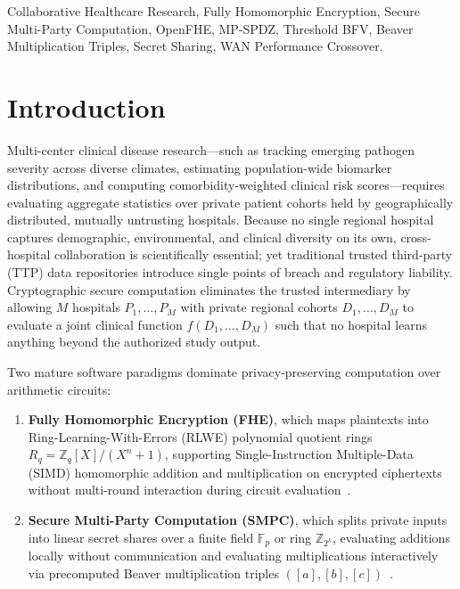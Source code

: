 \documentclass[conference]{IEEEtran}
\begin{document}
\begin{IEEEkeywords}
Collaborative Healthcare Research, Fully Homomorphic Encryption, Secure Multi-Party Computation, OpenFHE, MP-SPDZ, Threshold BFV, Beaver Multiplication Triples, Secret Sharing, WAN Performance Crossover.
\end{IEEEkeywords}

\section{Introduction}
Multi-center clinical disease research---such as tracking emerging pathogen severity across diverse climates, estimating population-wide biomarker distributions, and computing comorbidity-weighted clinical risk scores---requires evaluating aggregate statistics over private patient cohorts held by geographically distributed, mutually untrusting hospitals. Because no single regional hospital captures demographic, environmental, and clinical diversity on its own, cross-hospital collaboration is scientifically essential; yet traditional trusted third-party (TTP) data repositories introduce single points of breach and regulatory liability. Cryptographic secure computation eliminates the trusted intermediary by allowing $M$ hospitals $P_1, \dots, P_M$ with private regional cohorts $D_1, \dots, D_M$ to evaluate a joint clinical function $f(D_1, \dots, D_M)$ such that no hospital learns anything beyond the authorized study output.

Two mature software paradigms dominate privacy-preserving computation over arithmetic circuits:
\begin{enumerate}
    \item \textbf{Fully Homomorphic Encryption (FHE)}, which maps plaintexts into Ring-Learning-With-Errors (RLWE) polynomial quotient rings $R_q = \mathbb{Z}_q[X]/(X^n+1)$, supporting Single-Instruction Multiple-Data (SIMD) homomorphic addition and multiplication on encrypted ciphertexts without multi-round interaction during circuit evaluation~\cite{gentry2009,bfv2012,openfhe2022}.
    \item \textbf{Secure Multi-Party Computation (SMPC)}, which splits private inputs into linear secret shares over a finite field $\mathbb{F}_p$ or ring $\mathbb{Z}_{2^k}$, evaluating additions locally without communication and evaluating multiplications interactively via precomputed Beaver multiplication triples $([a], [b], [c])$~\cite{shamir1979,beaver1991,mpspdz2020}.
\end{enumerate}
\end{document}
